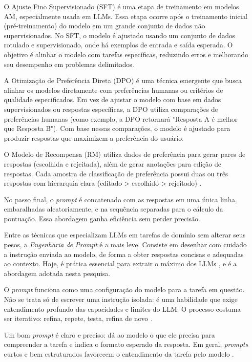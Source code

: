 O Ajuste Fino Supervisionado (SFT) é uma etapa de treinamento em modelos AM, especialmente usada em LLMs. Essa etapa ocorre após o treinamento inicial (pré-treinamento) do modelo em um grande conjunto de dados não supervisionados. No SFT, o modelo é ajustado usando um conjunto de dados rotulado e supervisionado, onde há exemplos de entrada e saída esperada. O objetivo é alinhar o modelo com tarefas específicas, reduzindo erros e melhorando seu desempenho em problemas delimitados.

A Otimização de Preferência Direta (DPO) é uma técnica emergente que busca alinhar os modelos diretamente com preferências humanas ou critérios de qualidade especificados. Em vez de ajustar o modelo com base em dados supervisionados ou respostas específicas, a DPO utiliza comparações de preferências humanas (como exemplo, a DPO retornará "Resposta A é melhor que Resposta B"). Com base nessas comparações, o modelo é ajustado para produzir respostas que maximizem a preferência do usuário.

O Modelo de Recompensa (RM) utiliza dados de preferência para gerar pares de respostas (escolhida e rejeitada), além de gerar anotações para edição de respostas. Cada amostra de classificação de preferência possui duas ou três respostas com hierarquia clara (editado > escolhido > rejeitado) \cite{llama3}.

No passo final, o \textit{prompt} é concatenado com as respostas em uma única linha, embaralhadas aleatoriamente, e na sequência separadas para o cálculo da pontuação. Essa abordagem ganha eficiência sem perder precisão.

Entre as técnicas que especializam LLMs em tarefas de domínio sem alterar seus pesos, a \textit{Engenharia de Prompt} é a mais leve. Consiste em desenhar com cuidado a instrução enviada ao modelo, de forma a obter respostas concisas e adequadas ao contexto. Hoje, é prática essencial para extrair o máximo dos LLMs \cite{brown2020}, e é a abordagem adotada nesta pesquisa.

O \textit{prompt} funciona como uma configuração do modelo para a tarefa em questão. Não se trata só de escrever uma instrução isolada: é uma habilidade que exige entendimento profundo das capacidades e limites do LLM. O processo costuma ser iterativo: refina, repete, testa, refina de novo \cite{nascimento2024}.

Um bom \textit{prompt} é claro e preciso: dá ao modelo o que ele precisa para compreender a tarefa e indica o formato esperado da resposta. Em geral, \textit{prompts} curtos e bem estruturados favorecem o entendimento da tarefa pelo modelo \cite{nascimento2024}.

